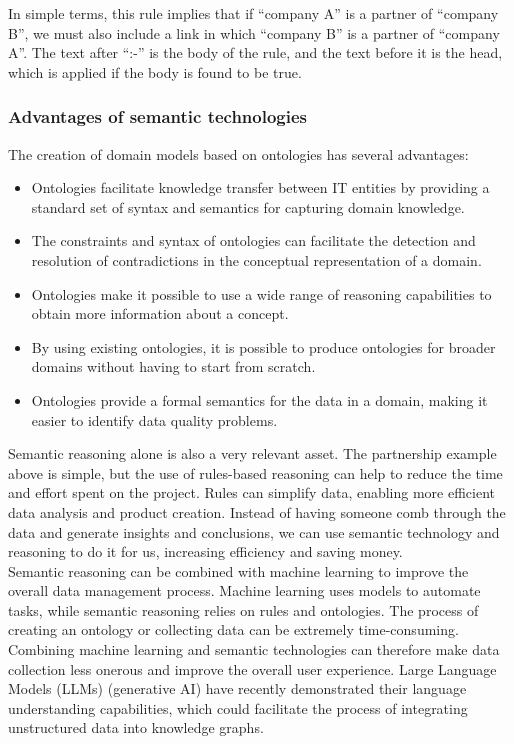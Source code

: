     In simple terms, this rule implies that if “company A” is a partner of “company B”, we must also include a link in which “company B” is a partner of “company A”. The text after “:-” is the body of the rule, and the text before it is the head, which is applied if the body is found to be true.


    \subsubsection{Advantages of semantic technologies}
    The creation of domain models based on ontologies has several advantages: 

    \begin{itemize}
        \item Ontologies facilitate knowledge transfer between IT entities by providing a standard set of syntax and semantics for capturing domain knowledge. 
        \item The constraints and syntax of ontologies can facilitate the detection and resolution of contradictions in the conceptual representation of a domain. 
        \item Ontologies make it possible to use a wide range of reasoning capabilities to obtain more information about a concept. 
        \item By using existing ontologies, it is possible to produce ontologies for broader domains without having to start from scratch. 
        \item Ontologies provide a formal semantics for the data in a domain, making it easier to identify data quality problems.
    \end{itemize}

    Semantic reasoning alone is also a very relevant asset. The partnership example above is simple, but the use of rules-based reasoning can help to reduce the time and effort spent on the project. Rules can simplify data, enabling more efficient data analysis and product creation. Instead of having someone comb through the data and generate insights and conclusions, we can use semantic technology and reasoning to do it for us, increasing efficiency and saving money.\\

    Semantic reasoning can be combined with machine learning to improve the overall data management process. Machine learning uses models to automate tasks, while semantic reasoning relies on rules and ontologies. The process of creating an ontology or collecting data can be extremely time-consuming. Combining machine learning and semantic technologies can therefore make data collection less onerous and improve the overall user experience. Large Language Models (LLMs) (generative AI) have recently demonstrated their language understanding capabilities, which could facilitate the process of integrating unstructured data into knowledge graphs.\\

